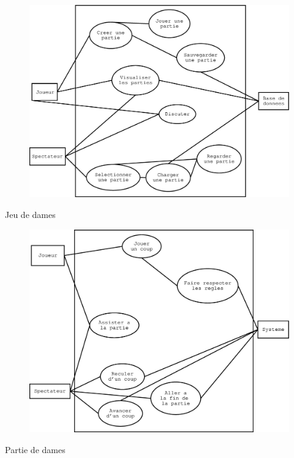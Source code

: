 \documentclass[french,12pt]{report}
\begin{document}
\begin{center}

\begin{figure}[h]
\includegraphics[width=16cm]{DUtilisation2.eps}
\end{figure}

Jeu de dames

\pagebreak

\begin{figure}[!h]
\includegraphics[width=16cm]{DUtilisation1.eps}
\end{figure}

Partie de dames

\end{center}
\end{document}
